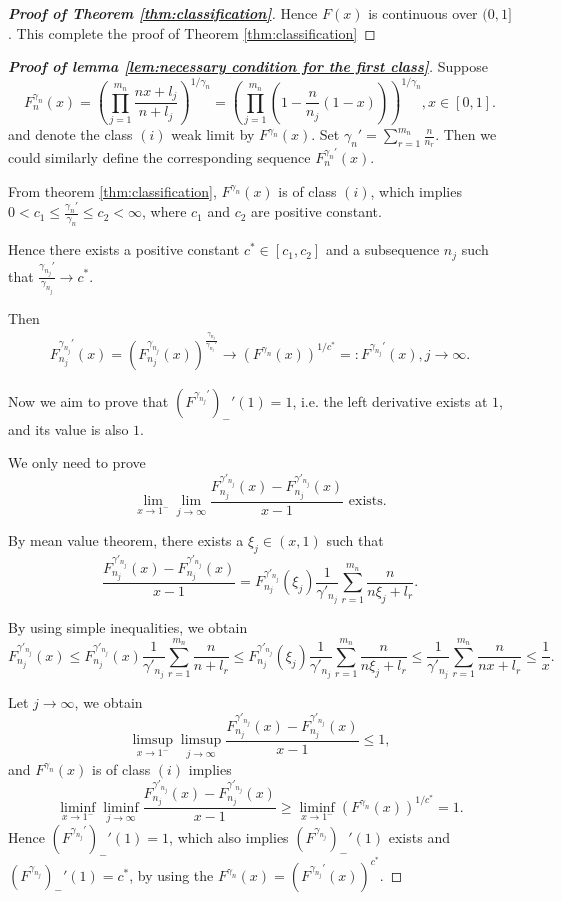 \documentclass[12pt]{article}
\theoremstyle{plain}
\theoremstyle{definition}
\theoremstyle{remark}
\begin{document}
\begin{proof}[\textit{\textbf{Proof of Theorem \ref{thm:classification}}}]
Hence $F(x)$ is continuous over $(0,1]$. This complete the proof of Theorem \ref{thm:classification}
\end{proof}

\begin{proof}[\textbf{Proof of lemma \ref{lem:necessary condition for the first class}}]Suppose 
$$
F^{\gamma_n}_{n}(x)=\left(\prod_{j=1}^{m_n} \frac{nx+l_{j} }{n+l_{j}}\right)^{1 / \gamma_{n}}=
    \left(\prod_{j=1}^{m_n} (1-\frac{n}{n_j}(1-x))\right) ^{1 / \gamma_{n}},  x \in[0,1].    
$$    
and denote the class $(i)$ weak limit by $F^{\gamma_n}(x)$. Set $\gamma_n'=\sum_{r=1}^{m_n}\frac{n}{n_r}$. Then we could similarly define the corresponding sequence $F^{\gamma_n'}_{n}(x)$.

From theorem \ref{thm:classification}, $F^{\gamma_n}(x)$ is of class $(i)$, which implies $0<c_1\leq\frac{\gamma_n'}{\gamma_n}\leq c_2<\infty$, where $c_1$ and $c_2$ are positive constant.

Hence there exists a positive constant $c^*\in [c_1,c_2]$ and a subsequence $n_j$ such that $\frac{\gamma_{n_j}'}{\gamma_{n_j}}\rightarrow c^*$.

Then 
\begin{align*}
    F^{\gamma_{n_j}'}_{n_j}(x)=(F^{\gamma_{n_j}}_{n_j}(x))^{\frac{\gamma_{n_j}}{\gamma_{n_j}'}}\rightarrow (F^{\gamma_n}(x))^{1/c^*}=:F^{\gamma_{n_j}'}(x),j\rightarrow \infty.
\end{align*}

Now we aim to prove that $(F^{\gamma_{n_j}'})_-'(1)=1$, i.e. the left derivative exists at $1$, and its value is also $1$.

We only need to prove 
$$
\lim_{x\rightarrow 1^-}\lim_{j\rightarrow \infty}\frac{F^{\gamma'_{n_j}}_{n_j}(x)-F^{\gamma'_{n_j}}_{n_j}(x)}{x-1} \text{ exists.}
$$

By mean value theorem, there exists a $\xi_j\in (x,1)$ such that
$$
\frac{F^{\gamma'_{n_j}}_{n_j}(x)-F^{\gamma'_{n_j}}_{n_j}(x)}{x-1}=F^{\gamma'_{n_j}}_{n_j}(\xi_j)\frac{1}{\gamma'_{n_j}}\sum_{r=1}^{m_n}\frac{n}{n\xi_j +l_r}.
$$

By using simple inequalities, we obtain
$$
F^{\gamma'_{n_j}}_{n_j}(x)\leq F^{\gamma'_{n_j}}_{n_j}(x)\frac{1}{\gamma'_{n_j}}\sum_{r=1}^{m_n}\frac{n}{n +l_r}\leq F^{\gamma'_{n_j}}_{n_j}(\xi_j)\frac{1}{\gamma'_{n_j}}\sum_{r=1}^{m_n}\frac{n}{n\xi_j +l_r}\leq \frac{1}{\gamma'_{n_j}}\sum_{r=1}^{m_n}\frac{n}{n x +l_r}\leq \frac{1}{x}.
$$

Let $j\rightarrow \infty$, we obtain 
$$
\limsup_{x\rightarrow 1^-}\limsup_{j\rightarrow \infty}\frac{F^{\gamma'_{n_j}}_{n_j}(x)-F^{\gamma'_{n_j}}_{n_j}(x)}{x-1} \leq 1,
$$
and $F^{\gamma_n}(x)$ is of class $(i)$ implies
$$
\liminf_{x\rightarrow 1^-}\liminf_{j\rightarrow \infty}\frac{F^{\gamma'_{n_j}}_{n_j}(x)-F^{\gamma'_{n_j}}_{n_j}(x)}{x-1} \geq \liminf_{x\rightarrow 1^-}(F^{\gamma_n}(x))^{1/c^*}=1.
$$
Hence $(F^{\gamma_{n_j}'})_-'(1)=1$, which also implies $(F^{\gamma_{n_j}})_-'(1)$ exists and $(F^{\gamma_{n_j}})_-'(1)=c^*$, by using the $F^{\gamma_n}(x)=(F^{\gamma_{n_j}'}(x))^{c^*}$.


\end{proof}
\end{document}
